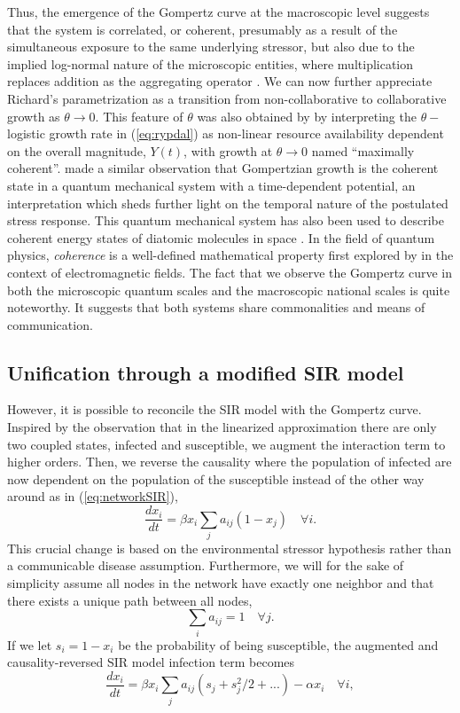\documentclass{article}
\begin{document}
Thus, the emergence of the Gompertz curve at the macroscopic level suggests that the system is correlated, or coherent, presumably as a result of the simultaneous exposure to the same underlying stressor, but also due to the implied log-normal nature of the microscopic entities, where multiplication replaces addition as the aggregating operator \citep{zhang1994log}.
We can now further appreciate Richard's parametrization as a transition from non-collaborative to collaborative growth as $\theta \rightarrow 0$. 
This feature of $\theta$ was also obtained by \citet{petroni2020logistic} by interpreting the $\theta-$logistic growth rate in (\ref{eq:rypdal}) as non-linear resource availability dependent on the overall magnitude, $Y(t)$, with growth at $\theta \rightarrow 0$ named ``maximally coherent''. 
\citet{molski2003coherent} made a similar observation that Gompertzian growth is the coherent state in a quantum mechanical system with a time-dependent potential, an interpretation which sheds further light on the temporal nature of the postulated stress response.
This quantum mechanical system has also been used to describe coherent energy states of diatomic molecules in space \citep{morse1929diatomic}. 
In the field of quantum physics, \emph{coherence} is a well-defined mathematical property first explored by \citet{glauber1963coherent} in the context of electromagnetic fields. The fact that we observe the Gompertz curve in both the microscopic quantum scales and the macroscopic national scales is quite noteworthy. It suggests that both systems share commonalities and means of communication.

\subsection{Unification through a modified SIR model}
However, it is possible to reconcile the SIR model with the Gompertz curve. 
Inspired by the observation that in the linearized approximation there are only two coupled states, infected and susceptible, we augment the interaction term to higher orders. 
Then, we reverse the causality where the population of infected are now dependent on the population of the susceptible instead of the other way around as in (\ref{eq:networkSIR}),
\begin{equation}
\label{eq:reverseNetworkSIR}
\frac{d x_i}{dt} = \beta x_i\sum_j{a_{ij}}(1-x_j) \quad \forall i.
\end{equation} 
This crucial change is based on the environmental stressor hypothesis rather than a communicable disease assumption.
Furthermore, we will for the sake of simplicity assume all nodes in the network have exactly one neighbor and that there exists a unique path between all nodes,
\begin{equation}
\sum_i a_{ij} = 1 \quad \forall j.
\end{equation} 
If we let $s_i = 1 - x_i$ be the probability of being susceptible, the augmented and causality-reversed SIR model infection term becomes 
\begin{equation}
\frac{d x_i}{dt} = \beta x_i\sum_j{a_{ij}}(s_{j} + s^2_j/2 + ...) - \alpha x_i\quad \forall i,
\end{equation}
\end{document}
